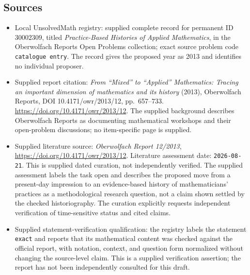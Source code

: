 \documentclass[11pt]{article}
\begin{document}
\subsection{Sources}
\begin{itemize}
\item Local UnsolvedMath registry: supplied complete record for permanent ID \(30002309\), titled \emph{Practice-Based Histories of Applied Mathematics}, in the Oberwolfach Reports Open Problems collection; exact source problem code \texttt{catalogue entry}. The record gives the proposed year as 2013 and identifies no individual proposer.
\item Supplied report citation: \emph{From ``Mixed'' to ``Applied'' Mathematics: Tracing an important dimension of mathematics and its history} (2013), Oberwolfach Reports, DOI 10.4171/owr/2013/12, pp.\ 657--733. \url{https://doi.org/10.4171/owr/2013/12}. The supplied background describes Oberwolfach Reports as documenting mathematical workshops and their open-problem discussions; no item-specific page is supplied.
\item Supplied literature source: \emph{Oberwolfach Report 12/2013}, \url{https://doi.org/10.4171/owr/2013/12}. Literature assessment date: \texttt{2026-08-21}. This is supplied dated curation, not independently verified. The supplied assessment labels the task open and describes the proposed move from a present-day impression to an evidence-based history of mathematicians' practices as a methodological research question, not a claim shown settled by the checked historiography. The curation explicitly requests independent verification of time-sensitive status and cited claims.
\item Supplied statement-verification qualification: the registry labels the statement \texttt{exact} and reports that its mathematical content was checked against the official report, with notation, context, and question form normalized without changing the source-level claim. This is a supplied verification assertion; the report has not been independently consulted for this draft.
\end{itemize}
\end{document}
